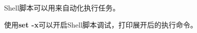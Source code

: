 \documentclass{ctexart}
\begin{document}
Shell脚本可以用来自动化执行任务。

使用\textbf{set -x}可以开启Shell脚本调试，打印展开后的执行命令。
\end{document}
